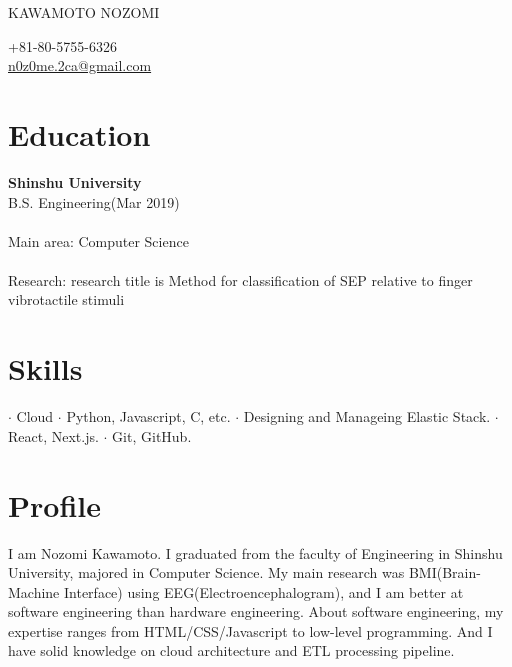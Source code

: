 \documentclass[12pt]{article} %
\begin{document}

\parbox[top][0.12\textheight][c]{\linewidth}{ %
	\vspace{-0.04\textheight} %
	{\color{name}\Huge KAWAMOTO NOZOMI}\\\medskip %
}

\begin{paracol}{2} %

{\faPhone} \hspace{1mm} +81-80-5755-6326 \\ %
{\small\faEnvelope} \hspace{1mm} \href{mailto:n0z0me.2ca@gmail.com}{\small n0z0me.2ca@gmail.com} \\ %

\vspace{1cm}

\section{\Large Education}
\textbf{\color{subtitle}\large Shinshu University}\\
B.S. Engineering(Mar 2019)\\
\\
Main area: Computer Science\\
\\
Research: research title is Method for classification of SEP relative to finger vibrotactile stimuli\\

\vspace{1cm}

\section{\Large Skills}
$\cdot$ Cloud
$\cdot$ Python, Javascript, C, etc.
$\cdot$ Designing and Manageing Elastic Stack.
$\cdot$ React, Next.js.
$\cdot$ Git, GitHub.

\switchcolumn %

\section{Profile}
I am Nozomi Kawamoto. I graduated from the faculty of Engineering in Shinshu University, majored in Computer Science. 
My main research was BMI(Brain-Machine Interface) using EEG(Electroencephalogram), and I am better at software engineering than hardware engineering.
About software engineering, my expertise ranges from HTML/CSS/Javascript to low-level programming. And I have solid knowledge on cloud architecture and ETL processing pipeline. 


\end{paracol}
\end{document}
